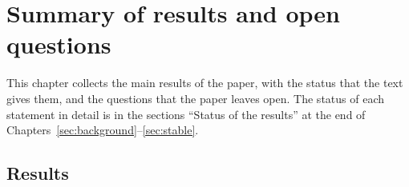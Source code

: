 
\chapter{Summary of results and open questions}\label{sec:summary}

This chapter collects the main results of the paper, with the status
that the text gives them, and the questions that the paper leaves open.
The status of each statement in detail is in the sections ``Status of
the results'' at the end of Chapters~\ref{sec:background}--\ref{sec:stable}.

\section*{Results}

